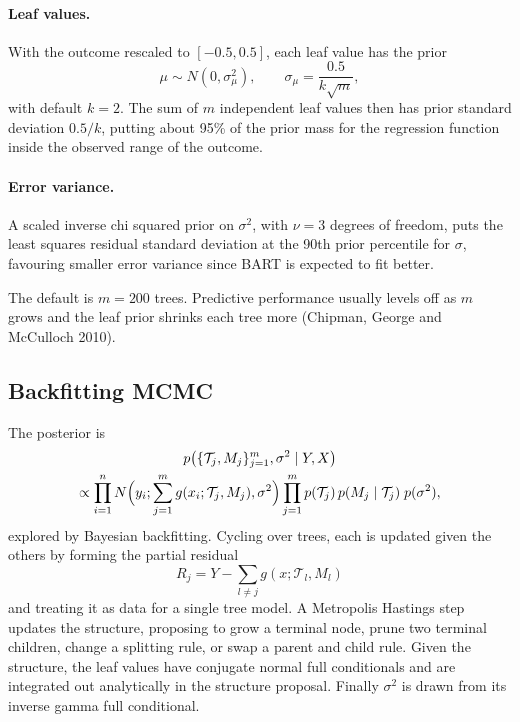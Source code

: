 \paragraph{Leaf values.} With the outcome rescaled to $[-0.5, 0.5]$, each leaf value has the prior
\[
\mu \sim N(0, \sigma_\mu^2), \qquad \sigma_\mu = \frac{0.5}{k\sqrt{m}},
\]
with default $k = 2$. The sum of $m$ independent leaf values then has prior standard deviation $0.5/k$, putting about 95\% of the prior mass for the regression function inside the observed range of the outcome.

\paragraph{Error variance.} A scaled inverse chi squared prior on $\sigma^2$, with $\nu = 3$ degrees of freedom, puts the least squares residual standard deviation at the 90th prior percentile for $\sigma$, favouring smaller error variance since BART is expected to fit better.

The default is $m = 200$ trees. Predictive performance usually levels off as $m$ grows and the leaf prior shrinks each tree more (Chipman, George and McCulloch 2010).

\subsection{Backfitting MCMC}

The posterior is
\begin{multline*}
p\bigl(\{\mathcal{T}_j, M_j\}_{j=1}^m, \sigma^2 \mid Y, X\bigr) \\
\propto \prod_{i=1}^n N\Bigl(y_i; \sum_{j=1}^m g(x_i; \mathcal{T}_j, M_j), \sigma^2\Bigr) \prod_{j=1}^m p(\mathcal{T}_j)\,p(M_j \mid \mathcal{T}_j)\; p(\sigma^2),
\end{multline*}
explored by Bayesian backfitting. Cycling over trees, each is updated given the others by forming the partial residual
\[
R_j = Y - \sum_{l \neq j} g(x; \mathcal{T}_l, M_l)
\]
and treating it as data for a single tree model. A Metropolis Hastings step updates the structure, proposing to grow a terminal node, prune two terminal children, change a splitting rule, or swap a parent and child rule. Given the structure, the leaf values have conjugate normal full conditionals and are integrated out analytically in the structure proposal. Finally $\sigma^2$ is drawn from its inverse gamma full conditional.



